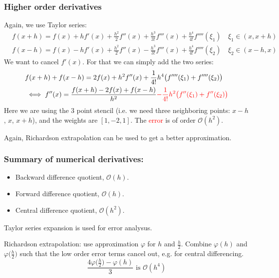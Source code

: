 \subsubsection{Higher order derivatives}
Again, we use Taylor series:
\begin{align*}
    &
    f(x+h) = f(x) + hf'(x) + \frac{h^2}{2} f''(x) + \frac{h^3}{3!} f'''(x) 
    + \frac{h^4}{4!} f''''(\xi_1) \quad \xi_1 \in (x, x + h)
    \\&
    f(x - h) = f(x) - hf'(x) + \frac{h^2}{2} f''(x) - \frac{h^3}{3!} f'''(x) 
    + \frac{h^4}{4!} f''''(\xi_2) \quad \xi_2 \in (x - h, x)
\end{align*}
We want to cancel $f'(x)$. For that we can simply add the two series:
\begin{align*}
    &f(x + h) + f(x - h) = 2f(x) + h^2 f''(x) + \frac{1}{4!} h^4 \bigl(
        f''''(\xi_1) + f''''(\xi_2)
    \bigr)
    \\&\iff
    f''(x) = \frac{f(x+h) - 2f(x) + f(x-h)}{h^2}
    \textcolor{red}{- \frac{1}{4!} h^2 \bigl(f''(\xi_1) + f''(\xi_2)\bigr) }
\end{align*}
Here we are using the 3 point stencil (i.e. we need three neighboring points:
$x - h$, $x$, $x+h$), and the weights are $[1, -2, 1]$.
The \textcolor{red}{error} is of order $\mathcal{O}(h^2)$.

Again, Richardson extrapolation can be used to get a better approximation.

\pagebreak
\subsubsection*{Summary of numerical derivatives:}
\begin{itemize}
    \item {
        Backward difference quotient, $\mathcal{O}(h)$.
    }
    \item {
        Forward difference quotient, $\mathcal{O}(h)$.
    }
    \item {
        Central difference quotient, $\mathcal{O}(h^2)$.
    }
\end{itemize}
Taylor series expansion is used for error analysus.

Richardson extrapolation: use approximation $\varphi$ for $h$ and $\frac{h}{2}$.
Combine $\varphi(h)$ and $\varphi\bigl(\frac{h}{2}\bigr)$ such that
the low order error terms cancel out, e.g. for central differencing.
\[
    \frac{4 \varphi\bigl(\frac{h}{2}\bigr) - \varphi(h)}{3}
    \text{ is } \mathcal{O}(h^4)
\]

